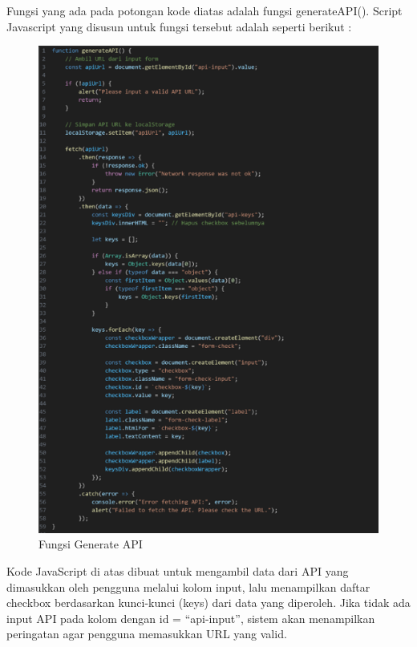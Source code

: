 Fungsi yang ada pada potongan kode diatas adalah fungsi generateAPI(). Script Javascript yang disusun untuk fungsi tersebut adalah seperti berikut :
	\begin{figure}[H]
	\centering
	\includegraphics[width=0.8\linewidth]{gambar/Pembahasan/fungsi Generate.png}
	\caption{Fungsi Generate API}
	\label{Fungsi Generate API}
\end{figure} 

Kode JavaScript di atas dibuat untuk mengambil data dari API yang dimasukkan oleh pengguna melalui kolom input, lalu menampilkan daftar checkbox berdasarkan kunci-kunci (keys) dari data yang diperoleh. Jika tidak ada input API pada kolom dengan id = “api-input”, sistem akan menampilkan peringatan agar pengguna memasukkan URL yang valid.\\
 
